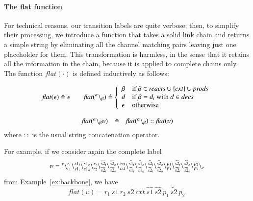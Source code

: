 \paragraph{The flat function}
For technical reasons, our transition labels are quite verbose; then, to simplify their processing, we introduce a function that takes a solid link chain and returns a simple string by eliminating all the channel matching pairs leaving just one placeholder for them. This transformation is harmless, in the sense that it retains all the information in the chain, because it is applied to complete chains only. 
The function $\mathit{flat}(\cdot)$ is defined inductively as follows:

\[
\mathit{flat}(\epsilon)\triangleq \epsilon 
\qquad
\mathit{flat}({}^{\alpha} \backslash_{\beta}) \triangleq 
\left \{ \begin{array}{ll} 
\beta & \mbox{if $\beta\in \mathit{reacts}\cup\{\mathit{cxt}\}\cup\mathit{prods}$}\\
d & \mbox{if $\beta=d_i$ with $d\in\mathit{decs}$}\\
\epsilon & \mbox{otherwise}  
\end{array} \right. 
\]

\[
\begin{array}{lcl}
\mathit{flat}({}^{\alpha} \backslash_{\beta}\upsilon)& \triangleq & \mathit{flat}({}^{\alpha} \backslash_{\beta}):: \mathit{flat}(\upsilon)\\
\end{array}\\
\]
where  $::$ is the usual string concatenation operator.

For example, if we consider again the complete label
$$
\upsilon =  {}^{\tau}
 \backslash_{r_1}^{r_1}
 \backslash_{s1_i}^{s1_i}
 \backslash_{s1_o}^{s1_o}
 \backslash_{r_2}^{r_2}
 \backslash_{\overline{s2}_i}^{\overline{s2}_i}
 \backslash_{\overline{s2}_o}^{\overline{s2}_o}
 \backslash_{\mathit{cxt}}^{\mathit{cxt}}
 \backslash_{\widehat{s1}_i}^{\widehat{s1}_i}
 \backslash_{\widehat{s1}_o}^{\widehat{s1}_o}
  \backslash_{\widehat{s2}_i}^{\widehat{s2}_i}
  \backslash_{\widehat{s2}_o}^{\widehat{s2}_o}
  \backslash_{p_1}^{p_1}
  \backslash_{\widetilde{s2}_i}^{\widetilde{s2}_i}
  \backslash_{\widetilde{s2}_o}^{\widetilde{s2}_o}
  \backslash_{p_2}^{p_2}
  \backslash_{\tau}
$$
from Example~\ref{ex:backbone}, we have
$$
\mathit{flat}(\upsilon) = 
r_1\ 
s1\ 
r_2\
\overline{s2}\ 
\mathit{cxt}\ 
\widehat{s1}\ 
\widehat{s2}\ 
p_1\ 
\widetilde{s2}\ 
p_2.
$$


